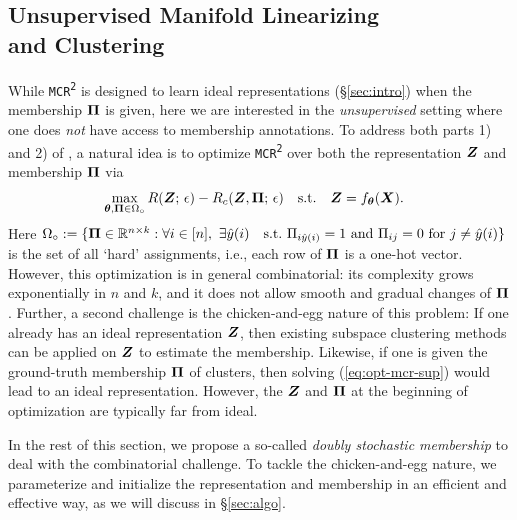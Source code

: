 \documentclass[10pt,twocolumn,letterpaper]{article}
\newcommand{\mcr}{\texttt{MCR\textsuperscript{2}}}
\begin{document}
   
   
   
   \subsection{Unsupervised Manifold Linearizing\\ and Clustering} \label{sec:mcr2-unsup-formulation}
   While \mcr{} is designed to learn ideal representations (\S \ref{sec:intro}) when the membership $\boldsymbol{\Pi}$ is given, here we are interested in the \textit{unsupervised} setting where one does \textit{not} have access to membership annotations. To address both parts 1) and 2) of , a natural idea is to optimize \mcr{} over both the representation ${\bm{Z}}$ and membership $\boldsymbol{\Pi}$ via
   \begin{align}
       & \max_{\boldsymbol{\theta},\boldsymbol{\Pi}\in\Omega_\circ} R({\bm{Z}};\,\epsilon)-R_c({\bm{Z}},\boldsymbol{\Pi};\,\epsilon)
       \quad \text{s.t.} \quad{\bm{Z}} = f_{\boldsymbol{\theta}}({\bm{X}}) \label{opt:mcr2-clustering-general}.
   \end{align}
   Here $\Omega_\circ := \{\boldsymbol{\Pi} \in {\mathbb{R}}^{n\times k}: \forall i \in [n], \,\, \exists \hat{y}(i) \quad \mathrm{s.t.} \,\,  \Pi_{i\hat{y}(i)}=1 \,\,  \mathrm{and}  \,\, \Pi_{ij}=0 \,\, \mathrm{for} \,\, j\neq  \hat{y}(i)\}$ is the set of all `hard' assignments, i.e., each row of $\boldsymbol{\Pi}$ is a one-hot vector. However, this optimization is in general combinatorial: its complexity grows exponentially in $n$ and $k$, and it does not allow smooth and gradual changes of $\boldsymbol{\Pi}$. Further, a second challenge is the chicken-and-egg nature of this problem: If one already has an ideal representation ${\bm{Z}}$, then existing subspace clustering methods can be applied on ${\bm{Z}}$ to estimate the membership. Likewise, if one is given the ground-truth membership $\boldsymbol{\Pi}$ of clusters, then solving (\ref{eq:opt-mcr-sup}) would lead to an ideal representation. However, the ${\bm{Z}}$ and $\boldsymbol{\Pi}$ at the beginning of optimization are typically far from ideal. 
   
   In the rest of this section, we propose a so-called \textit{doubly stochastic membership} to deal with the combinatorial challenge. To tackle the chicken-and-egg nature, we parameterize and initialize the representation and membership in an efficient and effective way, as we will discuss in \S \ref{sec:algo}.
   
\end{document}
